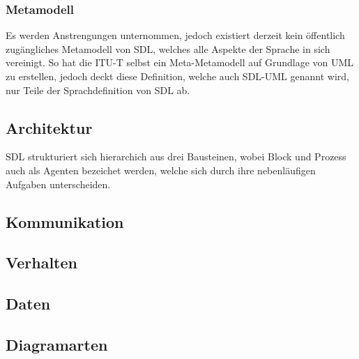 \subsubsection{Metamodell}
Es werden Anstrengungen unternommen, jedoch existiert derzeit kein öffentlich zugängliches Metamodell von \ac{SDL}, welches alle 
Aspekte der Sprache in sich vereinigt. So hat die \ac{ITU-T} selbst ein Meta-Metamodell auf Grundlage von 
\ac{UML} zu erstellen, jedoch deckt diese Definition, welche auch SDL-UML genannt wird, nur Teile der Sprachdefinition von \ac{SDL} 
ab.

\subsection{Architektur}
\ac{SDL} strukturiert sich hierarchich aus drei Bausteinen, wobei Block und Prozess auch als Agenten bezeichet werden, welche sich durch ihre nebenläufigen Aufgaben unterscheiden.
\begin{itemize}{
\item[System Agent]
\item[Block Agent]
\item[Prozess Agent] 
\end{itemize}
\subsection{Kommunikation}
\subsection{Verhalten}
\subsection{Daten}
\subsection{Diagramarten}
